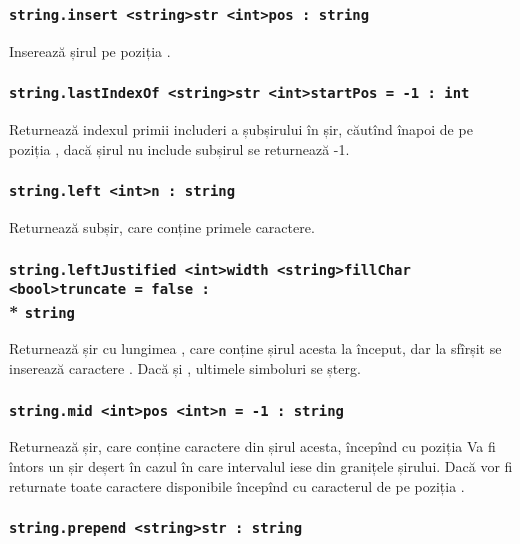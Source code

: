 \subsubsection{\lstinline|string.insert <string>str <int>pos : string|}

Inserează șirul  pe poziția .

\subsubsection{\lstinline|string.lastIndexOf <string>str <int>startPos = -1 : int|}

Returnează indexul primii includeri a șubșirului  în șir, căutînd înapoi de pe poziția , dacă șirul nu include subșirul se returnează -1.

\subsubsection{\lstinline|string.left <int>n : string|}

Returnează subșir, care conține primele  caractere.

\subsubsection{\lstinline|string.leftJustified <int>width <string>fillChar <bool>truncate = false :|\\* \lstinline|string|}

Returnează șir cu lungimea , care conține șirul acesta la început, dar la sfîrșit se inserează  caractere . Dacă  și , ultimele  simboluri se șterg.

\subsubsection{\lstinline|string.mid <int>pos <int>n = -1 : string|}

Returnează șir, care conține  caractere din șirul acesta, începînd cu poziția  Va fi întors un șir deșert în cazul în care intervalul iese din granițele șirului. Dacă  vor fi returnate toate caractere disponibile începînd cu caracterul de pe poziția .

\subsubsection{\lstinline|string.prepend <string>str : string|}

